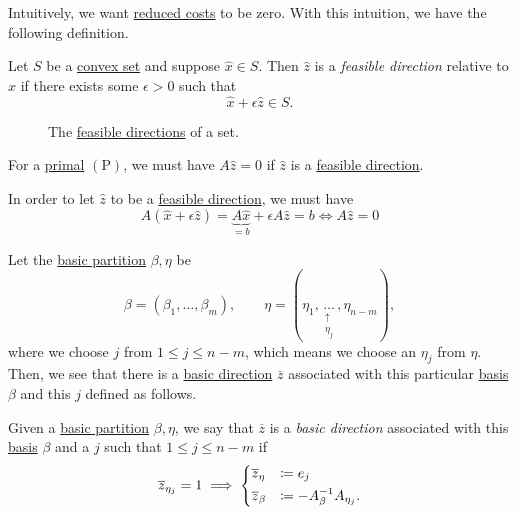Intuitively, we want \hyperref[def:reduced-cost]{reduced costs} to be zero. With this intuition, we have the following definition.

\begin{definition}\label{def:feasible-direction}
	Let \(S\) be a \hyperref[def:convex-set]{convex set} and suppose \(\hat{x}\in S\). Then \(\hat{z}\) is a \emph{feasible direction} relative to \(\hat{x}\) if there exists some \(\epsilon>0\) such that
	\[
		\hat{x}+\epsilon \hat{z} \in S.
	\]
\end{definition}

\begin{figure}[H]
	\centering
	\caption{The \hyperref[def:feasible-direction]{feasible directions} of a set.}
	\label{fig:feasible-direction}
\end{figure}

\begin{remark}
	For a \hyperref[def:primal]{primal} \((\mathrm{P})\), we must have \(A \hat{z} = 0\) if \(\hat{z}\) is a \hyperref[def:feasible-direction]{feasible direction}.
\end{remark}
\begin{explanation}
	In order to let \(\hat{z}\) to be a \hyperref[def:feasible-direction]{feasible direction}, we must have
	\[
		A(\hat{x} + \epsilon \hat{z}) = \underbrace{A \hat{x}}_{=b} + \epsilon A \hat{z} = b \iff A \hat{z} = 0
	\]
\end{explanation}

Let the \hyperref[def:basic-partition]{basic partition} \(\beta, \eta\) be
\[
	\beta = (\beta_1, \dots , \beta_m), \qquad \eta = (\eta_1, \underset{\substack{\uparrow \\ \eta_j}}{\dots} , \eta_{n-m}),
\]
where we choose \(j\) from \(1\leq j \leq n-m\), which means we choose an \(\eta_j\) from \(\eta\). Then, we see that there is a \hyperref[def:basic-direction]{basic direction} \(\overline{z}\) associated with this particular \hyperref[def:basis]{basis} \(\beta \) and this \(j\) defined as follows.

\begin{definition}\label{def:basic-direction}
	Given a \hyperref[def:basic-partition]{basic partition} \(\beta, \eta\), we say that \(\overline{z}\) is a \emph{basic direction} associated with this \hyperref[def:basis]{basis} \(\beta\)
	and a \(j\) such that \(1 \leq j \leq n-m\) if
	\[
		\overline{z}_{\eta_j} = 1 \implies \begin{dcases}
			\overline{z}_{\eta}  & \coloneqq e_j                        \\
			\overline{z}_{\beta} & \coloneqq -A^{-1}_{\beta}A_{\eta_j}.
		\end{dcases}
	\]
\end{definition}

